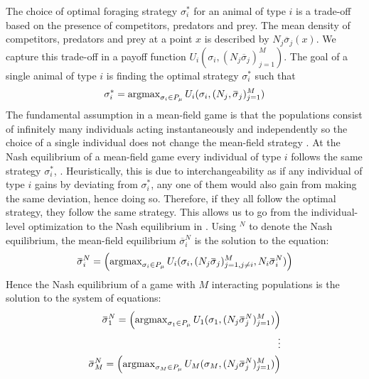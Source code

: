 The choice of optimal foraging strategy $\sigma_i^*$ for an animal of type $i$ is a trade-off based on the presence of competitors, predators and prey. The mean density of competitors, predators and prey at a point $x$ is described by $N_j \overbar{\sigma}_j(x)$. We capture this trade-off in a payoff function $U_i(\sigma_i, (N_j \overbar{\sigma}_j)_{j=1}^M)$. The goal of a single animal of type $i$ is finding the optimal strategy $\sigma_i^*$ such that
\begin{equation}
  \label{eq:ind_opt}
  \sigma^*_i = \argmax_{\sigma_i \in P_{\mu}} U_i(\sigma_i, (N_j, \overbar{\sigma}_j)_{j=1}^M)
\end{equation}
The fundamental assumption in a mean-field game is that the populations consist of infinitely many individuals acting instantaneously and independently so the choice of a single individual does not change the mean-field strategy \citep{aumann1964markets}. At the Nash equilibrium of a mean-field game every individual of type $i$ follows the same strategy $\sigma_i^*$, \citep{lasry2007mean, aumann1964markets}. Heuristically, this is due to interchangeability as if any individual of type $i$ gains by deviating from $\sigma_i^*$, any one of them would also gain from making the same deviation, hence doing so. Therefore, if they all follow the optimal strategy, they follow the same strategy. This allows us to go from the individual-level optimization to the Nash equilibrium in . %
Using $^N$ to denote the Nash equilibrium, the mean-field equilibrium $\overbar{\sigma}_i^N$ is the solution to the equation:
\begin{equation}
  \label{eq:mfg_ne}
  \overbar{\sigma}_i^N = \pa{\argmax_{\sigma_i \in P_{\mu}} U_i(\sigma_i, (N_j \overbar{\sigma}_j)_{j=1, j\neq i}^M, N_i \overbar{\sigma}_i^N) }
\end{equation}
Hence the Nash equilibrium of a game with $M$ interacting populations is the solution to the system of equations:
\begin{equation}
  \label{eq:tot_nash_eq}
  \begin{split}
    \overbar{\sigma}_1^N = \pa{\argmax_{\sigma_1 \in P_{\mu}} U_1(\sigma_1, (N_j \overbar{\sigma}^N_j)_{j=1}^M) } \\
    \vdots \\
    \overbar{\sigma}_M^N = \pa{\argmax_{\sigma_M \in P_{\mu}} U_M(\sigma_M, (N_j \overbar{\sigma}^N_j)_{j=1}^M) }
    \end{split}
\end{equation}
